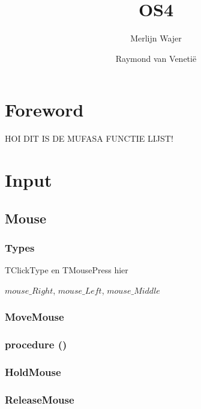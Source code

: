 \documentclass[a4paper]{report}
\begin{document}
\title{OS4}
\author{Merlijn Wajer \and Raymond van Veneti\"{e}}


\maketitle
\tableofcontents

\chapter{Foreword}

HOI DIT IS DE MUFASA FUNCTIE LIJST!

\chapter{Input}

\section{Mouse}

\subsection{Types}

TClickType en TMousePress hier

$mouse\_Right$, $mouse\_Left$, $mouse\_Middle$


\subsection{MoveMouse}

\subsection{\textbf{procedure} {\color{blue}{GetMousePos}}({\color{typeRed}{var x, y: }}{\color{typeGreen}{Integer}})}

\subsection{HoldMouse}

\subsection{ReleaseMouse}
\end{document}
